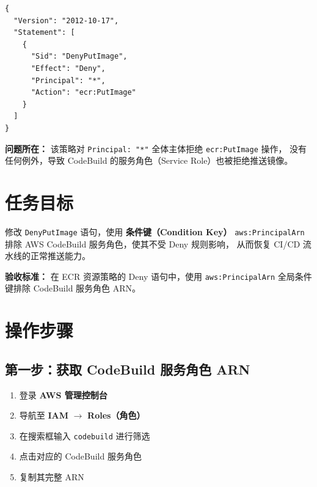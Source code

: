 \documentclass[12pt, a4paper]{article}
\begin{document}
\begin{lstlisting}[language={}]
{
  "Version": "2012-10-17",
  "Statement": [
    {
      "Sid": "DenyPutImage",
      "Effect": "Deny",
      "Principal": "*",
      "Action": "ecr:PutImage"
    }
  ]
}
\end{lstlisting}

\begin{warningbox}
  \textbf{问题所在：} 该策略对 \texttt{Principal: "*"} 全体主体拒绝 \texttt{ecr:PutImage} 操作，
  没有任何例外，导致 CodeBuild 的服务角色（Service Role）也被拒绝推送镜像。
\end{warningbox}

\section{任务目标}

修改 \texttt{DenyPutImage} 语句，使用 \textbf{条件键（Condition Key）}
\texttt{aws:PrincipalArn} 排除 AWS CodeBuild 服务角色，使其不受 Deny 规则影响，
从而恢复 CI/CD 流水线的正常推送能力。

\begin{successbox}
  \textbf{验收标准：} 在 ECR 资源策略的 Deny 语句中，使用 \texttt{aws:PrincipalArn}
  全局条件键排除 CodeBuild 服务角色 ARN。
\end{successbox}

\section{操作步骤}

\subsection{第一步：获取 CodeBuild 服务角色 ARN}

\begin{enumerate}[leftmargin=*, label=\textbf{\arabic*.}]
  \item 登录 \textbf{AWS 管理控制台}
  \item 导航至 \textbf{IAM} $\rightarrow$ \textbf{Roles（角色）}
  \item 在搜索框输入 \texttt{codebuild} 进行筛选
  \item 点击对应的 CodeBuild 服务角色
  \item 复制其完整 ARN
\end{enumerate}
\end{document}
